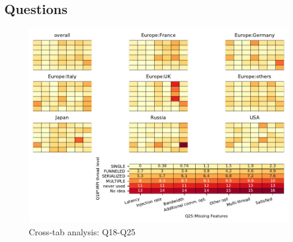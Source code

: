 
\subsection{Questions}


\begin{figure}
\begin{center}
\includegraphics[width=12cm]{../pdfs/Q18-Q25.pdf}
\caption{Cross-tab analysis: Q18-Q25}
\label{fig:Q18-Q25}
\end{center}
\end{figure}
